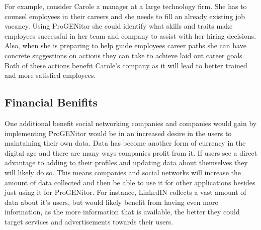 		For example, consider Carole a manager at a large technology firm.  She has
	to counsel employees in their careers and she needs to fill an already
	existing job vacancy.  Using ProGENitor she could identify what skills and
	traits make employees successful in her team and company to assist with her
	hiring decisions.  Also, when she is preparing to help guide employees career
	paths she can have concrete suggestions on actions they can take to achieve
	laid out career goals.  Both of these actions benefit Carole's company as it
	will lead to better trained and more satisfied employees.
\subsection{Financial Benifits}
		One additional benefit social networking companies and companies would gain by
	implementing ProGENitor would be in an increased desire in the users to
	maintaining their own data.  Data has become another form of currency in the
	digital age and there are many ways companies profit from it.  If users see a
	direct advantage to adding to their profiles and updating data about themselves
	they will likely do so.  This means companies and social networks will increase
	the amount of data collected and then be able to use it for other applications
	besides just using it for ProGENitor.  For instance, LinkedIN collects a vast
	amount of data about it's users, but would likely benefit from having even more
	information, as the more information that is available, the better they could
	target services and advertisements towards their users.
